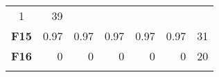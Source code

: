 \documentclass[12pt,a4paper]{article}
\begin{document}
\begin{longtable}[c]{@{}crrrrrr@{}}
\begin{minipage}[t]{0.11\columnwidth}
1
\strut\end{minipage} &
\begin{minipage}[t]{0.07\columnwidth}\raggedleft\strut
39
\strut\end{minipage}\tabularnewline
\begin{minipage}[t]{0.11\columnwidth}\centering\strut
\textbf{F15}
\strut\end{minipage} &
\begin{minipage}[t]{0.07\columnwidth}\raggedleft\strut
0.97
\strut\end{minipage} &
\begin{minipage}[t]{0.08\columnwidth}\raggedleft\strut
0.97
\strut\end{minipage} &
\begin{minipage}[t]{0.09\columnwidth}\raggedleft\strut
0.97
\strut\end{minipage} &
\begin{minipage}[t]{0.10\columnwidth}\raggedleft\strut
0.97
\strut\end{minipage} &
\begin{minipage}[t]{0.11\columnwidth}\raggedleft\strut
0.97
\strut\end{minipage} &
\begin{minipage}[t]{0.07\columnwidth}\raggedleft\strut
31
\strut\end{minipage}\tabularnewline
\begin{minipage}[t]{0.11\columnwidth}\centering\strut
\textbf{F16}
\strut\end{minipage} &
\begin{minipage}[t]{0.07\columnwidth}\raggedleft\strut
0
\strut\end{minipage} &
\begin{minipage}[t]{0.08\columnwidth}\raggedleft\strut
0
\strut\end{minipage} &
\begin{minipage}[t]{0.09\columnwidth}\raggedleft\strut
0
\strut\end{minipage} &
\begin{minipage}[t]{0.10\columnwidth}\raggedleft\strut
0
\strut\end{minipage} &
\begin{minipage}[t]{0.11\columnwidth}\raggedleft\strut
0
\strut\end{minipage} &
\begin{minipage}[t]{0.07\columnwidth}\raggedleft\strut
20
\strut\end{minipage}\tabularnewline
\begin{minipage}[t]{0.11\columnwidth}\centering\strut

\end{minipage}
\end{longtable}
\end{document}
